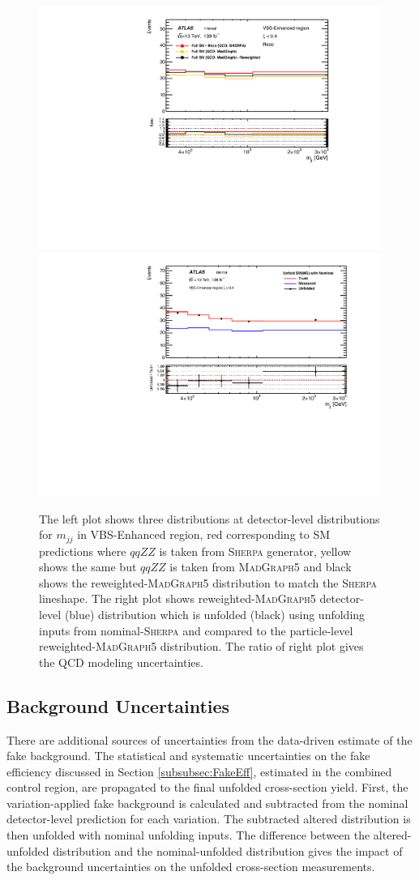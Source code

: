 \begin{itemize}
{    \begin{figure}
        \centering
        \includegraphics[width=.48\linewidth]{figures/Analysis/Systematics/QCDmodel_Dist.pdf}
        \includegraphics[width=.48\linewidth]{figures/Analysis/Systematics/QCDmodel_Unc.pdf}
        \caption{The left plot shows three distributions at detector-level distributions for $m_{jj}$ in VBS-Enhanced region, red corresponding to SM predictions where $qqZZ$ is taken from \textsc{Sherpa} generator, yellow shows the same but $qqZZ$ is taken from \textsc{MadGraph5} and black shows the reweighted-\textsc{MadGraph5} distribution to match the \textsc{Sherpa} lineshape. The right plot shows reweighted-\textsc{MadGraph5} detector-level (blue) distribution which is unfolded (black) using unfolding inputs from nominal-\textsc{Sherpa} and compared to the particle-level reweighted-\textsc{MadGraph5} distribution. The ratio of right plot gives the QCD modeling uncertainties. \label{fig:QCDModelUnc}}
 \end{figure}  

    }
\end{itemize}

\subsection{Background Uncertainties}
\label{subsec:BkgUnc}
There are additional sources of uncertainties from the data-driven estimate of the fake background. The statistical and systematic uncertainties on the fake efficiency discussed in Section \ref{subsubsec:FakeEff}, estimated in the combined control region, are propagated to the final unfolded cross-section yield. First, the variation-applied fake background is calculated and subtracted from the nominal detector-level prediction for each variation. The subtracted altered distribution is then unfolded with nominal unfolding inputs. The difference between the altered-unfolded distribution and the nominal-unfolded distribution gives the impact of the background uncertainties on the unfolded cross-section measurements.

